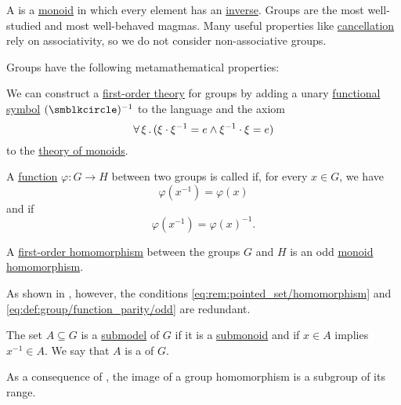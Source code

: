 \begin{definition}\label{def:group}
  A  is a \hyperref[def:monoid]{monoid} in which every element has an \hyperref[def:monoid_inverse]{inverse}. Groups are the most well-studied and most well-behaved magmas. Many useful properties like \hyperref[thm:def:group/cancellative]{cancellation} rely on associativity, so we do not consider non-associative groups.

  Groups have the following metamathematical properties:
  \begin{thmenum}
     We can construct a \hyperref[def:first_order_theory]{first-order theory} for groups by adding a unary \hyperref[def:first_order_language/fun]{functional symbol} \( (\anon)^{-1} \) to the language and the axiom
    \begin{equation}\label{eq:def:group/theory/inverse_axiom}
      \forall \thinspace \xi \thinspace . \thinspace (\xi \cdot \xi^{-1} = e \wedge \xi^{-1} \cdot \xi = e)
    \end{equation}
    to the \hyperref[def:monoid/theory]{theory of monoids}.

     A \hyperref[def:function]{function} \( \varphi: G \to H \) between two groups is called  if, for every \( x \in G \), we have
    \begin{equation}\label{eq:def:group/function_parity/even}
      \varphi(x^{-1}) = \varphi(x)
    \end{equation}
    and  if
    \begin{equation}\label{eq:def:group/function_parity/odd}
      \varphi(x^{-1}) = \varphi(x)^{-1}.
    \end{equation}

     A \hyperref[def:first_order_homomorphism]{first-order homomorphism} between the groups \( G \) and \( H \) is an odd \hyperref[def:monoid/homomorphism]{monoid homomorphism}.

    As shown in , however, the conditions \eqref{eq:rem:pointed_set/homomorphism} and \eqref{eq:def:group/function_parity/odd} are redundant.

     The set \( A \subseteq G \) is a \hyperref[thm:substructure_is_model]{submodel} of \( G \) if it is a \hyperref[def:monoid/submodel]{submonoid} and if \( x \in A \) implies \( x^{-1} \in A \). We say that \( A \) is a  of \( G \).

    As a consequence of , the image of a group homomorphism is a subgroup of its range.


\end{thmenum}
\end{definition}
